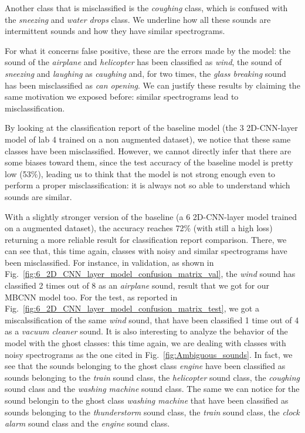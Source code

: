 \documentclass{article}
\begin{document}
\begin{sloppy}
Another class that is misclassified is the \textit{coughing} class, which is confused with the 
\textit{sneezing} and \textit{water drops} class. We underline how all these sounds are intermittent sounds
and how they have similar spectrograms.

For what it concerns false positive, these are the errors made by the model: the sound of the \textit{airplane} and
\textit{helicopter} has been classified as \textit{wind}, the sound of \textit{sneezing} and \textit{laughing} as \textit{caughing}
and, for two times, the \textit{glass breaking} sound has been misclassified as \textit{can opening}. We can justify
these results by claiming the same motivation we exposed before: similar spectrograms lead to misclassification.

By looking at the classification report of the baseline model (the 3 2D-CNN-layer model of lab 4 trained on a non augmented dataset),
we notice that these same classes have been misclassified. However,
we cannot directly infer that there are some biases toward them, since the test accuracy of the baseline model is pretty low (53\%),
leading us to think that the model is not strong enough even to perform a proper misclassification: it is always not so able to
understand which sounds are similar.

With a slightly stronger version of the baseline (a 6 2D-CNN-layer model trained on a augmented dataset), the accuracy
reaches 72\% (with still a high loss) returning a more reliable result for classification report comparison. There,
we can see that, this time again, classes with noisy and similar spectrograms have been misclassified. For instance, in validation, as shown in Fig.~\ref{fig:6_2D_CNN_layer_model_confusion_matrix_val},
the \textit{wind} sound has classified 2 times out of 8 as an \textit{airplane} sound, result that we got for our MBCNN model too.
For the test, as reported in Fig.~\ref{fig:6_2D_CNN_layer_model_confusion_matrix_test}, we got a miscalssification of the same \textit{wind} sound, that have been classified 1 time out of 4 as a \textit{vacuum cleaner} sound.
It is also interesting to analyze the behavior of the model with the ghost classes: this time again, we are dealing with classes
with noisy spectrograms as the one cited in Fig.~\ref{fig:Ambiguous_sounds}. In fact, we see that the sounds belonging to the ghost class \textit{engine} have been classified as
sounds belonging to the \textit{train} sound class, the \textit{helicopter} sound class, the \textit{coughing} sound class and the \textit{washing machine} sound class.
The same we can notice for the sound belongin to the ghost class \textit{washing machine} that have been classified as
sounds belonging to the \textit{thunderstorm} sound class, the \textit{train} sound class, the \textit{clock alarm} sound class and the \textit{engine} sound class.


\end{sloppy}
\end{document}
